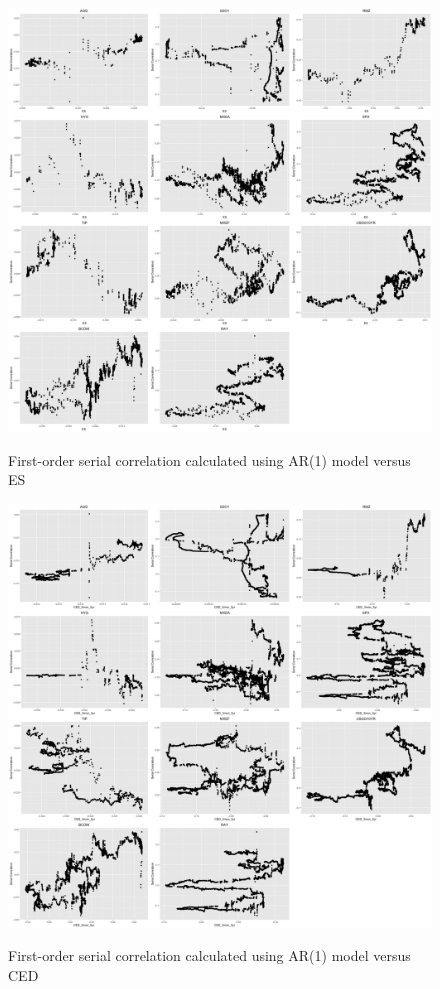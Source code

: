 \documentclass[12pt]{article}
\begin{document}
\begin{figure}
  \caption{First-order serial correlation calculated using AR(1) model versus ES}
  \includegraphics[width = 1\textwidth]{../results/SerCol-ES5yrAR1}
  \label{fig:SerCol-ES5yrAR1}
\end{figure}

\begin{figure}
  \caption{First-order serial correlation calculated using AR(1) model versus CED}
  \includegraphics[width = 1\textwidth]{../results/SerCol-CED5yr3monAR1}
  \label{fig:SerCol-CED5yr3monAR1}
\end{figure}
\end{document}
